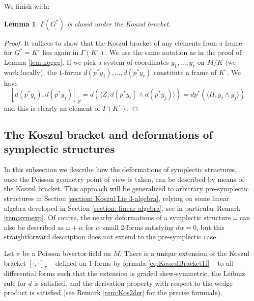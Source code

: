 \documentclass[11pt,thmsa]{amsart}
\newtheorem{lemma}[theorem]{Lemma}
\theoremstyle{definition}
\begin{document}
 
We finish  with:
\begin{lemma}\label{lem:g*g*g*}
$\Gamma(G^*)$ is closed under the Koszul bracket.
\end{lemma}
\begin{proof}
It suffices to show that the Koszul bracket of any elements from a frame for $G^*=K^\circ$ lies again in $\Gamma(K^\circ)$. We use the same notation as in the proof of Lemma \ref{lem:noggg}.
If we pick a system of coordinates $y_1,\dots,y_r$ on $M/K$ (we work locally), the $1$-forms
$d(p^*y_1),\dots, d(p^*y_r)$ constitute a frame of $K^\circ$.
We have
$$ [d(p^*y_i),d(p^*y_j)]_{Z}= d(\langle Z,d(p^*y_i)\wedge d(p^*y_j)\rangle)= dp^*(\langle\Pi,y_i\wedge y_j\rangle)$$
and this is clearly an element of $\Gamma(K^\circ)$.
\end{proof}


 \subsection{The Koszul bracket and deformations of symplectic structures}\label{subsection: symplectic}


In this subsection 
we describe how the deformations of symplectic structures, once the Poisson geometry point of view is taken, can be described by means of the Koszul bracket.
 This approach will be generalized to arbitrary pre-symplectic structures in Section \ref{section: Koszul Lie 3-algebra}, relying on some linear algebra developed in Section \ref{section: linear algebra},
see in particular Remark \ref{rem:symexp}. Of course, the nearby deformations of a symplectic structure $\omega$ can also be described as $\omega+\alpha$ for $\alpha$  small 2-forms satisfying $d\alpha=0$, but this straightforward description does not extend to the pre-symplectic case.

Let $\pi$ be a Poisson bivector field on $M$.
There is a unique extension of the Koszul bracket $[\cdot,\cdot]_\pi$ -- defined on $1$-forms by formula \eqref{eq:KoszulBracket1f} -- to all differential forms such that the extension is graded skew-symmetric, the Leibniz rule for $d$ is satisfied, and  the derivation property with respect to the wedge product is satisfied 
(see Remark \ref{rem:Kos2der} for the precise formuale).
 
\end{document}
